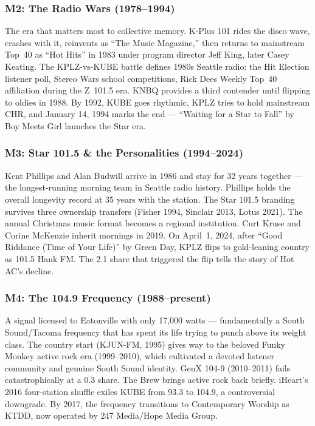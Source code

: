 \documentclass[11pt,letterpaper]{article}
\begin{document}
\subsubsection{M2: The Radio Wars (1978--1994)}

The era that matters most to collective memory. K-Plus 101 rides the disco wave, crashes with it, reinvents as ``The Music Magazine,'' then returns to mainstream Top~40 as ``Hot Hits'' in 1983 under program director Jeff King, later Casey Keating. The KPLZ-vs-KUBE battle defines 1980s Seattle radio: the Hit Election listener poll, Stereo Wars school competitions, Rick Dees Weekly Top~40 affiliation during the Z~101.5 era. KNBQ provides a third contender until flipping to oldies in 1988. By 1992, KUBE goes rhythmic, KPLZ tries to hold mainstream CHR, and January 14, 1994 marks the end --- ``Waiting for a Star to Fall'' by Boy Meets Girl launches the Star era.

\subsubsection{M3: Star 101.5 \& the Personalities (1994--2024)}

Kent Phillips and Alan Budwill arrive in 1986 and stay for 32 years together --- the longest-running morning team in Seattle radio history. Phillips holds the overall longevity record at 35 years with the station. The Star 101.5 branding survives three ownership transfers (Fisher 1994, Sinclair 2013, Lotus 2021). The annual Christmas music format becomes a regional institution. Curt Kruse and Corine McKenzie inherit mornings in 2019. On April~1, 2024, after ``Good Riddance (Time of Your Life)'' by Green Day, KPLZ flips to gold-leaning country as 101.5 Hank FM. The 2.1 share that triggered the flip tells the story of Hot AC's decline.

\subsubsection{M4: The 104.9 Frequency (1988--present)}

A signal licensed to Eatonville with only 17,000 watts --- fundamentally a South Sound/Tacoma frequency that has spent its life trying to punch above its weight class. The country start (KJUN-FM, 1995) gives way to the beloved Funky Monkey active rock era (1999--2010), which cultivated a devoted listener community and genuine South Sound identity. GenX 104-9 (2010--2011) fails catastrophically at a 0.3 share. The Brew brings active rock back briefly. iHeart's 2016 four-station shuffle exiles KUBE from 93.3 to 104.9, a controversial downgrade. By 2017, the frequency transitions to Contemporary Worship as KTDD, now operated by 247 Media/Hope Media Group.
\end{document}
